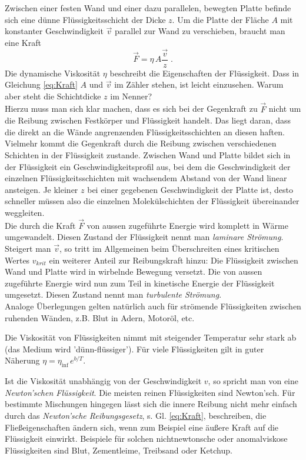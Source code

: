 Zwischen einer festen Wand und einer dazu parallelen, bewegten Platte befinde sich eine dünne Flüssigkeitsschicht der Dicke $z$. Um die Platte der Fläche $A$ mit konstanter Geschwindigkeit $\vec{v}$ parallel zur Wand zu verschieben, braucht man eine Kraft
\begin{equation} \label{eq:Kraft}
 \vec{F} = \eta\,A\frac{\vec{v}}{z}\; .
\end{equation}
Die dynamische Viskosität $\eta$ beschreibt die Eigenschaften der Flüssigkeit. Dass in Gleichung \ref{eq:Kraft} $A$ und $\vec{v}$ im Zähler stehen, ist leicht einzusehen. Warum aber steht die Schichtdicke $z$ im Nenner?\\
Hierzu muss man sich klar machen, dass es sich bei der Gegenkraft zu $\vec{F}$ nicht um die Reibung zwischen Festkörper und Flüssigkeit handelt. Das liegt daran, dass die direkt an die Wände angrenzenden Flüssigkeitsschichten an diesen haften. Vielmehr kommt die Gegenkraft durch die Reibung zwischen verschiedenen Schichten in der Flüssigkeit zustande. Zwischen Wand und Platte bildet sich in der Flüssigkeit ein Geschwindigkeitsprofil aus, bei dem die Geschwindigkeit der einzelnen Flüssigkeitsschichten mit wachsendem Abstand von der Wand linear ansteigen. Je kleiner $z$ bei einer gegebenen Geschwindigkeit der Platte ist, desto schneller müssen also die einzelnen Molekülschichten der Flüssigkeit übereinander weggleiten.\\
Die durch die Kraft $\vec{F}$ von aussen zugeführte Energie wird komplett in Wärme umgewandelt. Diesen Zustand der Flüssigkeit nennt man \textit{laminare Strömung}.\\

Steigert man $\vec{v}$, so tritt im Allgemeinen beim Überschreiten eines kritischen Wertes $v_{krit}$ ein weiterer Anteil zur Reibungskraft hinzu: Die Flüssigkeit zwischen Wand und Platte wird in wirbelnde Bewegung versetzt. Die von aussen zugeführte Energie wird nun zum Teil in kinetische Energie der Flüssigkeit umgesetzt. Diesen Zustand nennt man \textit{turbulente Strömung}.\\

Analoge Überlegungen gelten natürlich auch für strömende Flüssigkeiten zwischen ruhenden Wänden, z.B. Blut in Adern, Motoröl, etc.

Die Viskosität von Flüssigkeiten nimmt mit steigender Temperatur sehr stark ab (das Medium wird 'dünn-flüssiger'). Für viele Flüssigkeiten gilt in guter Näherung $\eta = \eta_{\inf}\, e^{b/T}$.

Ist die Viskosität unabhängig von der Geschwindigkeit $v$, so spricht man von eine \textit{Newton'schen Flüssigkeit}. Die meisten reinen Flüssigkeiten sind Newton'sch. Für bestimmte Mischungen hingegen lässt sich die innere Reibung nicht mehr einfach durch das \textit{Newton'sche Reibungsgesetz}, s. Gl. \ref{eq:Kraft}, beschreiben, die Fließeigenschaften ändern sich, wenn zum Beispiel eine äußere Kraft auf die Flüssigkeit einwirkt. Beispiele für solchen nichtnewtonsche oder anomalviskose Flüssigkeiten sind Blut, Zementleime, Treibsand oder Ketchup.

